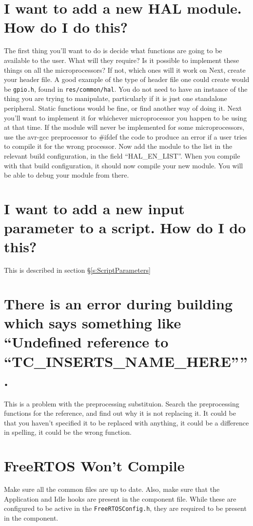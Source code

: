 \documentclass[a4paper, oneside, 11pt, titlepage, onecolumn, openright]{report}
\begin{document}
\section{I want to add a new HAL module. How do I do this?}
			\label{s:FAQNewHAL}
			The first thing you'll want to do is decide what functions are going to be available to the user. What will they require? Is it possible to implement these things on all the microprocessors? If not, which ones will it work on\newline
			Next, create your header file. A good example of the type of header file one could create would be \texttt{gpio.h}, found in \texttt{res/common/hal}. You do not need to have an instance of the thing you are trying to manipulate, particularly if it is just one standalone peripheral. Static functions would be fine, or find another way of doing it.\newline
			Next you'll want to implement it for whichever microprocessor you happen to be using at that time. If the module will never be implemented for some microprocessors, use the avr-gcc preprocessor to \#ifdef the code to produce an error if a user tries to compile it for the wrong processor.\newline
			Now add the module to the list in the relevant build configuration, in the field ``HAL\_EN\_LIST''. When you compile with that build configuration, it should now compile your new module. You will be able to debug your module from there.
			
\section{I want to add a new input parameter to a script. How do I do this?}
			\label{s:FAQNewParams}
			This is described in section \S\ref{s:ScriptParameters}
			
\section{There is an error during building which says something like ``Undefined reference to ``TC\_INSERTS\_NAME\_HERE''''.}
			\label{s:FAQUndefinedError}
			This is a problem with the preprocessing substituion. Search the preprocessing functions for the reference, and find out why it is not replacing it. It could be that you haven't specified it to be replaced with anything, it could be a difference in spelling, it could be the wrong function.
			
\section{FreeRTOS Won't Compile}
			\label{s:FAQFreeRTOS}
			Make sure all the common files are up to date. Also, make sure that the Application and Idle hooks are present in the component file. While these are configured to be active in the \texttt{FreeRTOSConfig.h}, they are required to be present in the component.
			 
			 

			

	\appendix
\end{document}

